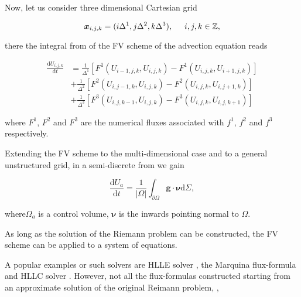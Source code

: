 Now, let us consider three dimensional Cartesian grid 

\begin{equation}
\boldsymbol{x}_{i,j,k} = (i\Delta^1,j\Delta^2,k\Delta^3), \hspace{5mm} i, j, k \in \mathbb{Z},
\end{equation}

there the integral from of the \ac{FV} scheme of the advection equation reads

\begin{align}
\frac{\text{d}U_{i,j,k}}{\text{d}t} &= \frac{1}{\Delta^1}[F^1(U_{i-1,j,k}, U_{i,j,k}) - F^1(U_{i,j,k}, U_{i+1,j,k})] \\
&+ \frac{1}{\Delta^2}[F^2(U_{i,j-1,k}, U_{i,j,k}) - F^2(U_{i,j,k}, U_{i,j+1,k})] \\
&+ \frac{1}{\Delta^3}[F^3(U_{i,j,k-1}, U_{i,j,k}) - F^3(U_{i,j,k}, U_{i,j,k+1})]
\label{eq:theory:fv:1storder3dscheme}
\end{align}

where $F^1$, $F^2$ and $F^3$ are the numerical fluxes associated with $f^1$, $f^2$ and $f^3$ respectively. 


Extending the \ac{FV} scheme to the multi-dimensional case and to a general unstructured grid, in a semi-discrete from we gain

\begin{equation}
\frac{\text{d}U_a}{\text{d}t} = \frac{1}{|\Omega|}\int_{\partial\Omega}\boldsymbol{g}\cdot\boldsymbol{\nu}\text{d}\Sigma,
\end{equation}

where$\Omega_a$ is a control volume, $\boldsymbol{\nu}$ is the inwards pointing normal to $\Omega$.

As long as the solution of the Riemann problem can be constructed, the \ac{FV} scheme can be applied to a system of equations. 

A popular examples or such solvers are \ac{HLLE} solver \citep{Roe:1981}, the Marquina flux-formula \citep{Donat:1996} and \ac{HLLC} solver \citep{Einfeldt:1988}. 
However, not all the flux-formulas constructed starting from an approximate solution of the original Reimann problem, \ie,

